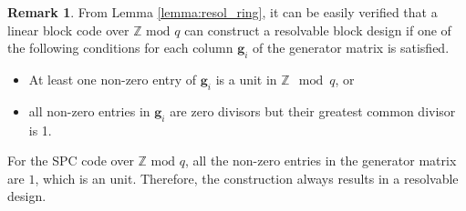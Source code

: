 \documentclass[journal,twocolumn]{IEEEtran}
\theoremstyle{definition}
\newtheorem{lemma}{Lemma}
\newtheorem{remark}{Remark}
\newcommand{\bfg}{\mathbf{g}}
\newcommand{\bfu}{\mathbf{u}}
\newcommand{\bfG}{\mathbf{G}}
\begin{document}
%
\begin{remark}
	From Lemma \ref{lemma:resol_ring}, it can be easily verified that a linear block code over $\mathbb{Z}\text{~mod~}q$ can construct a resolvable block design if one of the following conditions for each column $\bfg_i$ of the generator matrix is satisfied.
	\begin{itemize}
		\item At least one non-zero entry of $\bfg_i$ is a unit in $\mathbb{Z} \mod q$, or
		\item all non-zero entries in $\bfg_i$ are zero divisors but their greatest common divisor is 1.
	\end{itemize}	
	For the SPC code over $\mathbb{Z}\text{~mod~}q$, all the non-zero entries in the generator matrix are $1$, which is an unit. Therefore, the construction always results in a resolvable design.
\end{remark}
\end{document}
